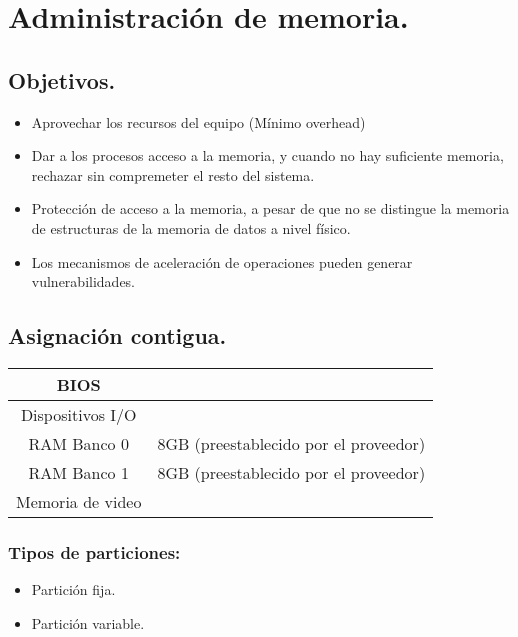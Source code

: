 \newpage
\chapter{Administraci\'{o}n de memoria.}

\section{Objetivos.}
\begin{itemize}
	\item Aprovechar los recursos del equipo (M\'{i}nimo overhead)\
	\item Dar a los procesos acceso a la memoria, y cuando no hay suficiente memoria, rechazar sin compremeter el resto del sistema.
	\item Protecci\'{o}n de acceso a la memoria, a pesar de que no se distingue la memoria de estructuras de la memoria de datos a nivel f\'{i}sico.
	\item Los mecanismos de aceleraci\'{o}n de operaciones pueden generar vulnerabilidades.
\end{itemize}

\section{Asignaci\'{o}n contigua.}
\begin{center}
	\begin{tabular}{| c c}
		\hline
		BIOS&\\
		\hline
		\hline
		Dispositivos I/O&\\
		\hline
		\hline
		RAM Banco 0&8GB (preestablecido por el proveedor)\\
		\hline
		RAM Banco 1&8GB (preestablecido por el proveedor)\\
		\hline
		\hline
		Memoria de video&\\
		\hline
	\end{tabular}
\end{center}
\subsection{Tipos de particiones:}
\begin{itemize}
	\item Partici\'{o}n fija.
	\item Partici\'{o}n variable.
	
\end{itemize}


